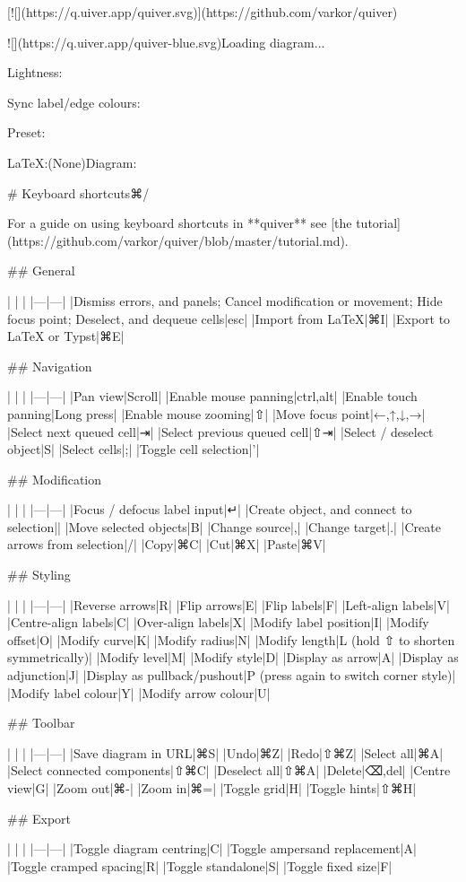 \documentclass[preview]{standalone}
\begin{document}
[![](https://q.uiver.app/quiver.svg)](https://github.com/varkor/quiver)

![](https://q.uiver.app/quiver-blue.svg)Loading diagram...

Lightness:

Sync label/edge colours:

Preset:

LaTeX:(None)Diagram:

# Keyboard shortcuts⌘/

For a guide on using keyboard shortcuts in **quiver** see [the tutorial](https://github.com/varkor/quiver/blob/master/tutorial.md).

## General

|   |   |
|---|---|
|Dismiss errors, and panels; Cancel modification or movement; Hide focus point; Deselect, and dequeue cells|esc|
|Import from LaTeX|⌘I|
|Export to LaTeX or Typst|⌘E|

## Navigation

|   |   |
|---|---|
|Pan view|Scroll|
|Enable mouse panning|ctrl,alt|
|Enable touch panning|Long press|
|Enable mouse zooming|⇧|
|Move focus point|←,↑,↓,→|
|Select next queued cell|⇥|
|Select previous queued cell|⇧⇥|
|Select / deselect object|S|
|Select cells|;|
|Toggle cell selection|'|

## Modification

|   |   |
|---|---|
|Focus / defocus label input|↵|
|Create object, and connect to selection||
|Move selected objects|B|
|Change source|,|
|Change target|.|
|Create arrows from selection|/|
|Copy|⌘C|
|Cut|⌘X|
|Paste|⌘V|

## Styling

|   |   |
|---|---|
|Reverse arrows|R|
|Flip arrows|E|
|Flip labels|F|
|Left-align labels|V|
|Centre-align labels|C|
|Over-align labels|X|
|Modify label position|I|
|Modify offset|O|
|Modify curve|K|
|Modify radius|N|
|Modify length|L (hold ⇧ to shorten symmetrically)|
|Modify level|M|
|Modify style|D|
|Display as arrow|A|
|Display as adjunction|J|
|Display as pullback/pushout|P (press again to switch corner style)|
|Modify label colour|Y|
|Modify arrow colour|U|

## Toolbar

|   |   |
|---|---|
|Save diagram in URL|⌘S|
|Undo|⌘Z|
|Redo|⇧⌘Z|
|Select all|⌘A|
|Select connected components|⇧⌘C|
|Deselect all|⇧⌘A|
|Delete|⌫,del|
|Centre view|G|
|Zoom out|⌘-|
|Zoom in|⌘=|
|Toggle grid|H|
|Toggle hints|⇧⌘H|

## Export

|   |   |
|---|---|
|Toggle diagram centring|C|
|Toggle ampersand replacement|A|
|Toggle cramped spacing|R|
|Toggle standalone|S|
|Toggle fixed size|F|
\end{document}
